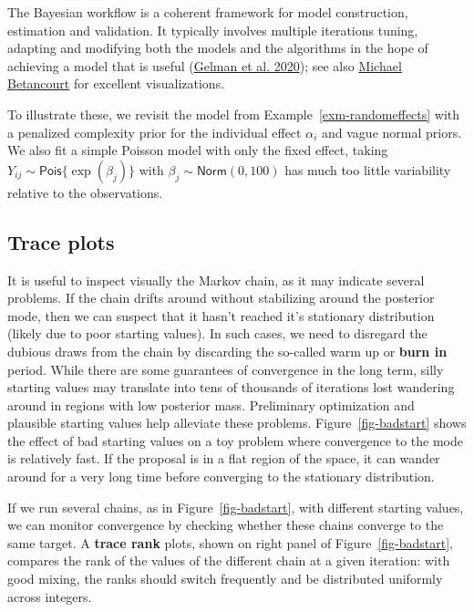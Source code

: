 \documentclass[
  11pt,
  letterpaper,
]{scrbook}
\theoremstyle{definition}
\theoremstyle{definition}
\theoremstyle{definition}
\theoremstyle{plain}
\theoremstyle{remark}
\begin{document}
The Bayesian workflow is a coherent framework for model construction,
estimation and validation. It typically involves multiple iterations
tuning, adapting and modifying both the models and the algorithms in the
hope of achieving a model that is useful
(\protect\hyperlink{ref-Gelman:2020}{Gelman et al. 2020}); see also
\href{https://betanalpha.github.io/assets/case_studies/principled_bayesian_workflow.html}{Michael
Betancourt} for excellent visualizations.

To illustrate these, we revisit the model from
Example~\ref{exm-randomeffects} with a penalized complexity prior for
the individual effect \(\alpha_i\) and vague normal priors. We also fit
a simple Poisson model with only the fixed effect, taking
\(Y_{ij} \sim \mathsf{Pois}\{\exp(\beta_j)\}\) with
\(\beta_j \sim \mathsf{Norm}(0,100)\) has much too little variability
relative to the observations.

\hypertarget{trace-plots}{%
\subsection{Trace plots}\label{trace-plots}}

It is useful to inspect visually the Markov chain, as it may indicate
several problems. If the chain drifts around without stabilizing around
the posterior mode, then we can suspect that it hasn't reached it's
stationary distribution (likely due to poor starting values). In such
cases, we need to disregard the dubious draws from the chain by
discarding the so-called warm up or \textbf{burn in} period. While there
are some guarantees of convergence in the long term, silly starting
values may translate into tens of thousands of iterations lost wandering
around in regions with low posterior mass. Preliminary optimization and
plausible starting values help alleviate these problems.
Figure~\ref{fig-badstart} shows the effect of bad starting values on a
toy problem where convergence to the mode is relatively fast. If the
proposal is in a flat region of the space, it can wander around for a
very long time before converging to the stationary distribution.

If we run several chains, as in Figure~\ref{fig-badstart}, with
different starting values, we can monitor convergence by checking
whether these chains converge to the same target. A \textbf{trace rank}
plots, shown on right panel of Figure~\ref{fig-badstart}, compares the
rank of the values of the different chain at a given iteration: with
good mixing, the ranks should switch frequently and be distributed
uniformly across integers.
\end{document}
